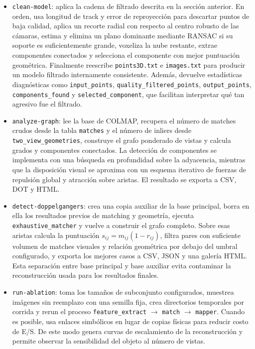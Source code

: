 \documentclass[conference]{IEEEtran}
\begin{document}
\begin{itemize}
  \item \texttt{clean-model}: aplica la cadena de filtrado descrita en la secci\'on anterior. En orden, usa longitud de track y error de reproyecci\'on para descartar puntos de baja calidad, aplica un recorte radial con respecto al centro robusto de las c\'amaras, estima y elimina un plano dominante mediante RANSAC si su soporte es suficientemente grande, voxeliza la nube restante, extrae componentes conectados y selecciona el componente con mejor puntuaci\'on geom\'etrica. Finalmente reescribe \texttt{points3D.txt} e \texttt{images.txt} para producir un modelo filtrado internamente consistente. Adem\'as, devuelve estad\'isticas diagn\'osticas como \texttt{input\_points}, \texttt{quality\_filtered\_points}, \texttt{output\_points}, \texttt{components\_found} y \texttt{selected\_component}, que facilitan interpretar qu\'e tan agresivo fue el filtrado.

  \item \texttt{analyze-graph}: lee la base de COLMAP, recupera el n\'umero de matches crudos desde la tabla \texttt{matches} y el n\'umero de inliers desde \texttt{two\_view\_geometries}, construye el grafo ponderado de vistas y calcula grados y componentes conectados. La detecci\'on de componentes se implementa con una b\'usqueda en profundidad sobre la adyacencia, mientras que la disposici\'on visual se aproxima con un esquema iterativo de fuerzas de repulsi\'on global y atracci\'on sobre aristas. El resultado se exporta a CSV, DOT y HTML.

  \item \texttt{detect-doppelgangers}: crea una copia auxiliar de la base principal, borra en ella los resultados previos de matching y geometr\'ia, ejecuta \texttt{exhaustive\_matcher} y vuelve a construir el grafo completo. Sobre esas aristas calcula la puntuaci\'on \(s_{ij}=m_{ij}(1-r_{ij})\), filtra pares con suficiente volumen de matches visuales y relaci\'on geom\'etrica por debajo del umbral configurado, y exporta los mejores casos a CSV, JSON y una galer\'ia HTML. Esta separaci\'on entre base principal y base auxiliar evita contaminar la reconstrucci\'on usada para los resultados finales.

  \item \texttt{run-ablation}: toma los tama\~nos de subconjunto configurados, muestrea im\'agenes sin reemplazo con una semilla fija, crea directorios temporales por corrida y rerun el proceso \texttt{feature\_extract} \(\rightarrow\) \texttt{match} \(\rightarrow\) \texttt{mapper}. Cuando es posible, usa enlaces simb\'olicos en lugar de copias f\'isicas para reducir costo de E/S. De este modo genera curvas de escalamiento de la reconstrucci\'on y permite observar la sensibilidad del objeto al n\'umero de vistas.


\end{itemize}
\end{document}
